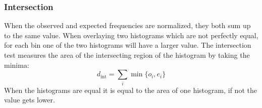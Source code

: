 \subsubsection{Intersection}
When the observed and expected frequencies are normalized, they both sum up to the same value. When overlaying two histograms which are not perfectly equal, for each bin one of the two histograms will have a larger value. The intersection test measures the area of the intersecting region of the histogram by taking the minima:
\begin{equation}
d_{\text{int}} = \sum_{i} \min \{ o_i, e_i \}
\end{equation}
When the histograms are equal it is equal to the area of one histogram, if not the value gets lower.
